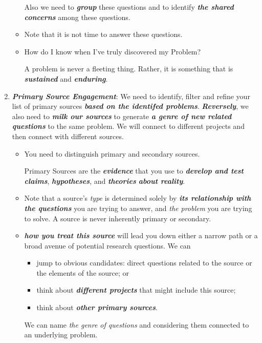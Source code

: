 \documentclass[11pt]{article}
\begin{document}
\begin{enumerate}
\begin{itemize}
Also we need to \emph{\textbf{group}} these questions and to identify \emph{\textbf{the shared concerns}} among these questions.

\item Note that it is not time to answer these questions. 

\item How do I know when I’ve truly discovered my Problem? 

A problem is never a fleeting thing. Rather, it is something that is \emph{\textbf{sustained}} and \emph{\textbf{enduring}}.
\end{itemize}

\item \emph{\textbf{Primary Source Engagement}}: We need to identify, filter and refine your list of primary sources \emph{\textbf{based on the identifed problems}}. \emph{\textbf{Reversely}}, we also need to \emph{\textbf{milk our sources}} to generate \emph{\textbf{a genre of new related questions}} to the same problem. We will connect to different projects and then connect with different sources.
\begin{itemize}
\item You need to distinguish primary and secondary sources.

Primary Sources are the \emph{\textbf{evidence}} that you use to \emph{\textbf{develop and test claims}}, \emph{\textbf{hypotheses}}, and \emph{\textbf{theories} \textbf{about reality}}. 

\item Note that a source’s \emph{type} is determined solely by \emph{\textbf{its relationship with the questions}} you are trying to answer, and \emph{the problem} you are trying to solve. A source is never inherently primary or secondary.

\item \emph{\textbf{how you treat this source}} will lead you down either a narrow path or a broad avenue of potential research questions. We can
\begin{itemize}
\item jump to obvious candidates: direct questions related to the source or the elements of the source; or
\item think about \emph{\textbf{different projects}} that might include this source;
\item think about \emph{\textbf{other primary sources}}.
\end{itemize} We can name \emph{the genre of questions} and considering them connected to an underlying problem. 


\end{itemize}
\end{enumerate}
\end{document}
